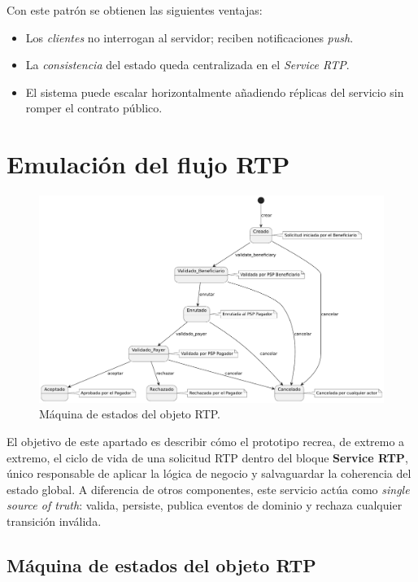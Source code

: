 Con este patrón se obtienen las siguientes ventajas:

\begin{itemize}
  \item Los \emph{clientes} no interrogan al servidor; reciben notificaciones \emph{push}.
  \item La \emph{consistencia} del estado queda centralizada en el \emph{Service RTP}.
  \item El sistema puede escalar horizontalmente añadiendo réplicas del servicio
        sin romper el contrato público.
\end{itemize}



\section{Emulación del flujo RTP}
\label{subsec:emulacion_flujo_rtp}

\begin{figure}[htbp]
  \centering
  \includegraphics[width=.85\textwidth]{Imagenes/DiagEstado.pdf}
  \caption{Máquina de estados del objeto RTP.}
  \label{fig:state_machine_rtp}
\end{figure}

El objetivo de este apartado es describir cómo el prototipo recrea, de extremo a extremo, el ciclo de vida de una solicitud RTP dentro del bloque \textbf{Service RTP}, único responsable de aplicar la lógica de negocio y salvaguardar la coherencia del estado global. A diferencia de otros componentes, este servicio actúa como \emph{single source of truth}: valida, persiste, publica eventos de dominio y rechaza cualquier transición inválida.

\subsection{Máquina de estados del objeto RTP}
\label{subsec:rtp_state_machine}

